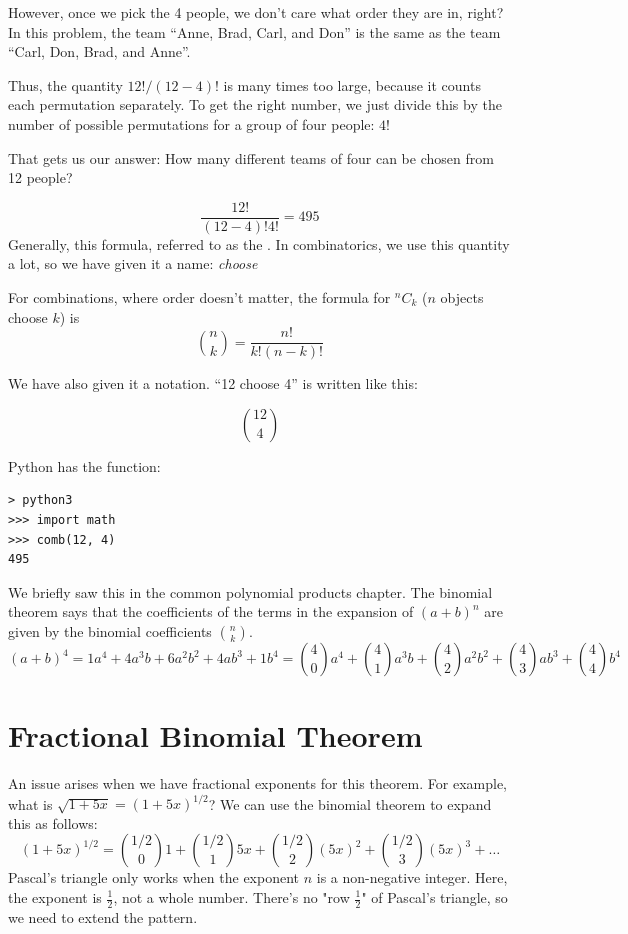 However, once we pick the 4 people, we don't care what order they are
in, right?  In this problem, the team ``Anne, Brad, Carl, and Don'' is
the same as the team ``Carl, Don, Brad, and Anne''.

Thus, the quantity $12! / (12 - 4)!$ is many times too large, because
it counts each permutation separately. To get the right number, we
just divide this by the number of possible permutations for a group of
four people: $4!$

That gets us our answer: How many different teams of four can be chosen from 12 people?

$$\frac{12!}{(12-4)! 4!}= 495$$
Generally, this formula, referred to as the . 
In combinatorics, we use this quantity a lot, so we have given it a name: \textit{choose}
\begin{mdframed}[frametitle = {Combinations}, style = important]
For combinations, where order doesn't matter, the formula for ${}^n C_k$ ($n$ objects choose $k$) is 
$${n \choose k} = \frac{n!}{k!(n-k)!}$$
\end{mdframed}
We have also given it a notation. ``12 choose 4'' is written like this:

$${12 \choose 4}$$

Python has the  function:

\begin{verbatim}
> python3
>>> import math
>>> comb(12, 4)
495  
\end{verbatim}

We briefly saw this in the common polynomial products chapter. The binomial theorem says that the coefficients of the terms in the expansion of $(a + b)^n$ are given by the binomial coefficients ${n \choose k}$.
\begin{equation*}
(a + b)^4 = 1a^4 + 4a^3b + 6a^2 b^2 + 4 a b^3 + 1 b^4 =\binom{4}{0}a^4 + \binom{4}{1}a^3b + \binom{4}{2}a^2b^2 + \binom{4}{3}ab^3 + \binom{4}{4}b^4
\end{equation*}
\section{Fractional Binomial Theorem}
An issue arises when we have fractional exponents for this theorem. For example, what is $\sqrt{1+5x}=(1 + 5x)^{1/2}$? We can use the binomial theorem to expand this as follows:
\begin{equation*}
(1 + 5x)^{1/2} = \binom{1/2}{0}1 + \binom{1/2}{1}5x + \binom{ 
1/2}{2}(5x)^2 + \binom{1/2}{3}(5x)^3 + \ldots
\end{equation*}
Pascal's triangle only works when the exponent $n$ is a non-negative integer. Here, the exponent is $\frac{1}{2}$, not a whole number. There's no "row $\frac{1}{2}$" of Pascal's triangle, so we need to extend the pattern.

